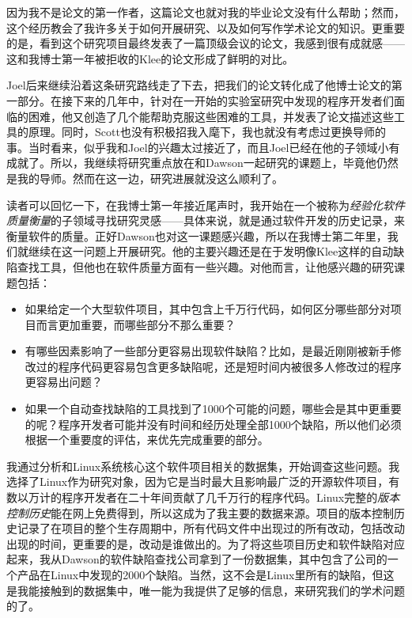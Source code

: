 \documentclass[letter,12pt]{book}
\begin{document}
\begin{CJK}{UTF8}{gbsn}
因为我不是论文的第一作者，这篇论文也就对我的毕业论文没有什么帮助；然而，这个经历教会了我许多关于如何开展研究、以及如何写作学术论文的知识。更重要的是，看到这个研究项目最终发表了一篇顶级会议的论文，我感到很有成就感——这和我博士第一年被拒收的Klee的论文形成了鲜明的对比。

Joel后来继续沿着这条研究路线走了下去，把我们的论文转化成了他博士论文的第一部分。在接下来的几年中，针对在一开始的实验室研究中发现的程序开发者们面临的困难，他又创造了几个能帮助克服这些困难的工具，并发表了论文描述这些工具的原理。同时，Scott也没有积极招我入麾下，我也就没有考虑过更换导师的事。当时看来，似乎我和Joel的兴趣太过接近了，而且Joel已经在他的子领域小有成就了。所以，我继续将研究重点放在和Dawson一起研究的课题上，毕竟他仍然是我的导师。然而在这一边，研究进展就没这么顺利了。

\breakline

读者可以回忆一下，在我博士第一年接近尾声时，我开始在一个被称为\emph{经验化软件质量衡量}的子领域寻找研究灵感——具体来说，就是通过软件开发的历史记录，来衡量软件的质量。正好Dawson也对这一课题感兴趣，所以在我博士第二年里，我们就继续在这一问题上开展研究。他的主要兴趣还是在于发明像Klee这样的自动缺陷查找工具，但他也在软件质量方面有一些兴趣。对他而言，让他感兴趣的研究课题包括：

\begin{itemize}
\item 如果给定一个大型软件项目，其中包含上千万行代码，如何区分哪些部分对项目而言更加重要，而哪些部分不那么重要？
\item 有哪些因素影响了一些部分更容易出现软件缺陷？比如，是最近刚刚被新手修改过的程序代码更容易包含更多缺陷呢，还是短时间内被很多人修改过的程序更容易出问题？
\item 如果一个自动查找缺陷的工具找到了1000个可能的问题，哪些会是其中更重要的呢？程序开发者可能并没有时间和经历处理全部1000个缺陷，所以他们必须根据一个重要度的评估，来优先完成重要的部分。
\end{itemize}

我通过分析和Linux系统核心这个软件项目相关的数据集，开始调查这些问题。我选择了Linux作为研究对象，因为它是当时最大且影响最广泛的开源软件项目，有数以万计的程序开发者在二十年间贡献了几千万行的程序代码。Linux完整的\emph{版本控制历史}能在网上免费得到，所以这成为了我主要的数据来源。项目的版本控制历史记录了在项目的整个生存周期中，所有代码文件中出现过的所有改动，包括改动出现的时间，更重要的是，改动是谁做出的。为了将这些项目历史和软件缺陷对应起来，我从Dawson的软件缺陷查找公司拿到了一份数据集，其中包含了公司的一个产品在Linux中发现的2000个缺陷。当然，这不会是Linux里所有的缺陷，但这是我能接触到的数据集中，唯一能为我提供了足够的信息，来研究我们的学术问题的了。


\end{CJK}
\end{document}
